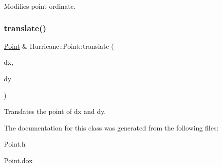 Modifies point ordinate. \mbox{\label{classHurricane_1_1Point_a86d908d60346bc15f1af4e96eddbdb19}} 
\subsubsection{\texorpdfstring{translate()}{translate()}}
{\footnotesize\ttfamily \mbox{\hyperlink{classHurricane_1_1Point}{Point}} \& Hurricane\+::\+Point\+::translate (\begin{DoxyParamCaption}\item[{const \mbox{\hyperlink{group__DbUGroup_ga4fbfa3e8c89347af76c9628ea06c4146}{Db\+U\+::\+Unit}} \&}]{dx,  }\item[{const \mbox{\hyperlink{group__DbUGroup_ga4fbfa3e8c89347af76c9628ea06c4146}{Db\+U\+::\+Unit}} \&}]{dy }\end{DoxyParamCaption})}

Translates the point of dx and dy. 

The documentation for this class was generated from the following files\+:\begin{DoxyCompactItemize}
\item 
Point.\+h\item 
Point.\+dox\end{DoxyCompactItemize}
